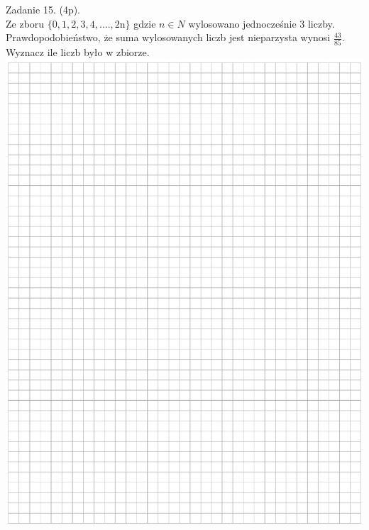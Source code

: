 \documentclass[10pt]{article}
\begin{document}
Zadanie 15. (4p).\\
Ze zboru \(\{0,1,2,3,4, \ldots ., 2 \mathrm{n}\}\) gdzie \(n \in N\) wylosowano jednocześnie 3 liczby.\\
Prawdopodobieństwo, że suma wylosowanych liczb jest nieparzysta wynosi \(\frac{43}{85}\).\\
Wyznacz ile liczb było w zbiorze.\\
\includegraphics[max width=\textwidth, center]{2024_11_21_498389c978c770348ebcg-13}
\end{document}
